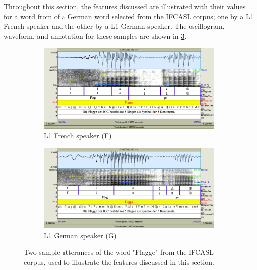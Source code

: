 

	Throughout this section, the features discussed are illustrated with their values for a word from  of a German word selected from the IFCASL corpus; one by a L1 French speaker and the other by a L1 German speaker. The oscillogram, waveform, and annotation for these samples are shown in \cref{fig:featuresexample}.
	
	\begin{figure}
		\centering
		\begin{subfigure}[t]{\textwidth}
                \includegraphics[width=\textwidth]{img/screenshots/2SH05_FGMB1_527-flagge}
                \caption{L1 French speaker (F)}
                \label{fig:featuresexample:fg}
        \end{subfigure}%
        \vspace{1.5em}
                \vspace{1.5em}

        \begin{subfigure}[b]{\textwidth}
                \includegraphics[width=\textwidth]{img/screenshots/2SH05_GGMB2_035-flagge}
                \caption{L1 German speaker (G)}
                \label{fig:featuresexample:gg}
        \end{subfigure}%
		\caption{Two sample utterances of the word "Flagge" from the IFCASL corpus, used to illustrate the features discussed in this section. }
		\label{fig:featuresexample}
	\end{figure}
	
